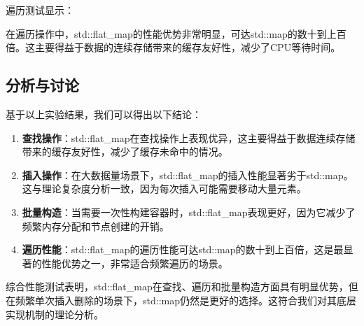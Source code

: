 \documentclass[a4paper, 12pt]{article}
\begin{document}
遍历测试显示：

\begin{center}\vspace{-20pt}
\end{center}

在遍历操作中，std::flat\_map的性能优势非常明显，可达std::map的数十到上百倍。这主要得益于数据的连续存储带来的缓存友好性，减少了CPU等待时间。

\subsection{分析与讨论}

基于以上实验结果，我们可以得出以下结论：

\begin{enumerate}
    \setlength{\itemsep}{0pt}
    \setlength{\parsep}{0pt}
    \setlength{\parskip}{0pt}
    \item \textbf{查找操作}：std::flat\_map在查找操作上表现优异，这主要得益于数据连续存储带来的缓存友好性，减少了缓存未命中的情况。
    
    \item \textbf{插入操作}：在大数据量场景下，std::flat\_map的插入性能显著劣于std::map。这与理论复杂度分析一致，因为每次插入可能需要移动大量元素。
    
    \item \textbf{批量构造}：当需要一次性构建容器时，std::flat\_map表现更好，因为它减少了频繁内存分配和节点创建的开销。
    
    \item \textbf{遍历性能}：std::flat\_map的遍历性能可达std::map的数十到上百倍，这是最显著的性能优势之一，非常适合频繁遍历的场景。
\end{enumerate}

综合性能测试表明，std::flat\_map在查找、遍历和批量构造方面具有明显优势，但在频繁单次插入删除的场景下，std::map仍然是更好的选择。这符合我们对其底层实现机制的理论分析。
\end{document}

